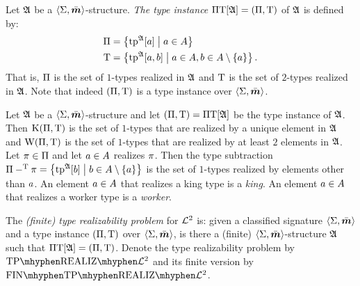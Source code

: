 \begin{definition}
Let $\mathfrak{A}$ be a $\left\langle \mathrm{\Sigma},\bar{\bm{m}} \right\rangle$-structure.
\emph{The type instance} $\Pi\mathrm{T}[\mathfrak{A}] = (\Pi,\mathrm{T})$ of $\mathfrak{A}$ is defined by:
\begin{align*}
  \Pi &= \left\{\operatorname{tp}^{\mathfrak{A}}[a]\mathrel{}\middle|\mathrel{}a \in A\right\} \\
  \mathrm{T} &= \left\{\operatorname{tp}^{\mathfrak{A}}[a,b]\mathrel{}\middle|\mathrel{}a \in A, b \in A \setminus \left\{a\right\}\right\}.
\end{align*}
That is, $\Pi$ is the set of $1$-types realized in $\mathfrak{A}$ and $\mathrm{T}$ is the
set of $2$-types realized in $\mathfrak{A}$.
Note that indeed $(\Pi,\mathrm{T})$ is a type instance over $\left\langle \mathrm{\Sigma},\bar{\bm{m}} \right\rangle$.
\end{definition}
\begin{remark}\label{rem:tpi-char}
Let $\mathfrak{A}$ be a $\left\langle \mathrm{\Sigma},\bar{\bm{m}} \right\rangle$-structure and let $(\Pi,\mathrm{T}) =
\Pi\mathrm{T}[\mathfrak{A}]$ be the type instance of $\mathfrak{A}$.
Then $\mathrm{K}(\Pi,\mathrm{T})$ is the set of $1$-types that are realized by a unique
element in $\mathfrak{A}$ and $\mathrm{W}(\Pi,\mathrm{T})$ is the set of $1$-types that are
realized by at least $2$ elements in $\mathfrak{A}$. Let $\pi \in \Pi$ and let $a
\in A$ realizes $\pi$. Then the type subtraction 
$\Pi -^{\mathrm{T}} \pi = \left\{\operatorname{tp}^{\mathfrak{A}}[b]\mathrel{}\middle|\mathrel{}b \in A \setminus \left\{a\right\}\right\}$ 
is the set of $1$-types realized by elements other than $a$.
An element $a \in A$ that realizes a king type is a \emph{king}.
An element $a \in A$ that realizes a worker type is a \emph{worker}.
\end{remark}

\begin{definition}
The \emph{(finite) type realizability problem} for $\mathcal{L}^{2}$ is: given a
classified signature $\left\langle \mathrm{\Sigma},\bar{\bm{m}} \right\rangle$ and a type instance $(\Pi,\mathrm{T})$ over $\left\langle \mathrm{\Sigma},\bar{\bm{m}} \right\rangle$,
is there a (finite) $\left\langle \mathrm{\Sigma},\bar{\bm{m}} \right\rangle$-structure $\mathfrak{A}$ such that $\Pi\mathrm{T}[\mathfrak{A}] =
(\Pi,\mathrm{T})$.
Denote the type realizability problem by $\Real{\vFo2}$ and its finite version
by $\FinReal{\vFo2}$.
\end{definition}

